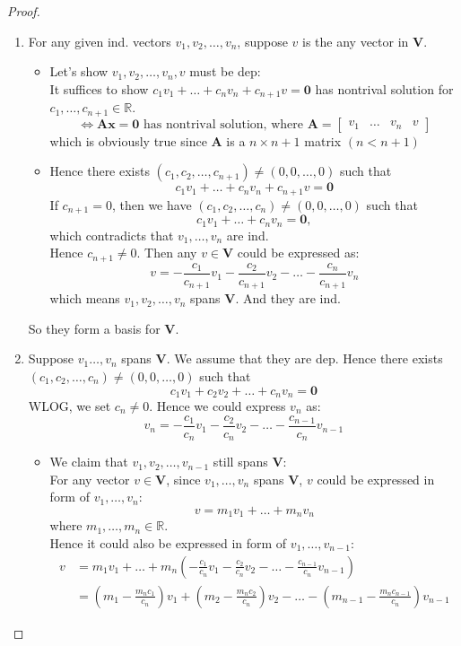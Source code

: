 \begin{enumerate}
\begin{proof}
\begin{enumerate}
\item
For any given ind. vectors $v_1,v_2,\dots,v_n$, suppose $v$ is the any vector in $\bm V$.\\
\begin{itemize}
\item
Let's show $v_1,v_2,\dots,v_n,v$ must be dep:\\
It suffices to show $c_1v_1+\dots+c_nv_n+c_{n+1}v=\bm 0$ has nontrival solution for $c_1,\dots,c_{n+1}\in\mathbb{R}$.
\[
\Longleftrightarrow \bm{Ax} = \bm 0\text{ has nontrival solution, where $\bm A=\left[\begin{array}{c|c|c|c}
v_1&\dots&v_n&v
\end{array}\right]$}
\]
which is obviously true since $\bm A$ is a $n\times n+1$ matrix $(n<n+1)$
\item
Hence there exists $(c_1,c_2,\dots,c_{n+1})\ne(0,0,\dots,0)$ such that \[c_1v_1+\dots+c_nv_n+c_{n+1}v=\bm 0\]
If $c_{n+1}=0$, then we have $(c_1,c_2,\dots,c_{n})\ne(0,0,\dots,0)$ such that \[c_1v_1+\dots+c_nv_n=\bm 0,\] which contradicts that $v_1,\dots,v_n$ are ind.\\
Hence $c_{n+1}\ne0$. Then any $v\in\bm V$ could be expressed as:
\[
v = -\frac{c_1}{c_{n+1}}v_1-\frac{c_2}{c_{n+1}}v_2-\dots-\frac{c_n}{c_{n+1}}v_n
\]
which means $v_1,v_2,\dots,v_n$ spans $\bm V$. And they are ind. 
\end{itemize}
So they form a basis for $\bm V$.
\item
Suppose $v_1\dots,v_n$ spans $\bm V$. We assume that they are dep. Hence there exists $(c_1,c_2,\dots,c_n)\ne(0,0,\dots,0)$ such that 
\[
c_1v_1+c_2v_2+\dots+c_nv_n=\bm 0
\]
WLOG, we set $c_n\ne0$. Hence we could express $v_n$ as:
\[
v_n=-\frac{c_1}{c_n}v_1-\frac{c_2}{c_n}v_2-\dots-\frac{c_{n-1}}{c_n}v_{n-1}
\]
\begin{itemize}
\item
We claim that $v_1,v_2,\dots,v_{n-1}$ still spans $\bm V$:\\
For any vector $v\in\bm V$, since $v_1,\dots,v_n$ spans $\bm V$, $v$ could be expressed in form of $v_1,\dots,v_n$:
\[
v=m_1v_1+\dots+m_nv_n
\]
where $m_1,\dots,m_n\in\mathbb{R}.$\\
Hence it could also  be expressed in form of $v_1,\dots,v_{n-1}$:
\[
\begin{aligned}
v&=m_1v_1+\dots+m_n(-\frac{c_1}{c_n}v_1-\frac{c_2}{c_n}v_2-\dots-\frac{c_{n-1}}{c_n}v_{n-1})\\
&=(m_1-\frac{m_nc_1}{c_n})v_1+(m_2-\frac{m_nc_2}{c_n})v_2-\dots-(m_{n-1}-\frac{m_nc_{n-1}}{c_n})v_{n-1}

\end{aligned}\]
\end{itemize}
\end{enumerate}
\end{proof}
\end{enumerate}
